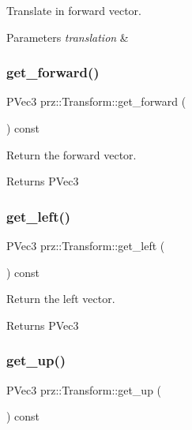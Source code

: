 Translate in forward vector. 


\begin{DoxyParams}{Parameters}
{\em translation} & \\
\hline
\end{DoxyParams}
\mbox{\label{classprz_1_1_transform_ae3b522803756c21b856cc4dba3b6419f}} 
\subsubsection{\texorpdfstring{get\_forward()}{get\_forward()}}
{\footnotesize\ttfamily P\+Vec3 prz\+::\+Transform\+::get\+\_\+forward (\begin{DoxyParamCaption}{ }\end{DoxyParamCaption}) const}



Return the forward vector. 

\begin{DoxyReturn}{Returns}
P\+Vec3 
\end{DoxyReturn}
\mbox{\label{classprz_1_1_transform_ac9d9a4e551e2777d36a32817e953ac94}} 
\subsubsection{\texorpdfstring{get\_left()}{get\_left()}}
{\footnotesize\ttfamily P\+Vec3 prz\+::\+Transform\+::get\+\_\+left (\begin{DoxyParamCaption}{ }\end{DoxyParamCaption}) const}



Return the left vector. 

\begin{DoxyReturn}{Returns}
P\+Vec3 
\end{DoxyReturn}
\mbox{\label{classprz_1_1_transform_a4f92c2dccb1af841857930395711906d}} 
\subsubsection{\texorpdfstring{get\_up()}{get\_up()}}
{\footnotesize\ttfamily P\+Vec3 prz\+::\+Transform\+::get\+\_\+up (\begin{DoxyParamCaption}{ }\end{DoxyParamCaption}) const}



